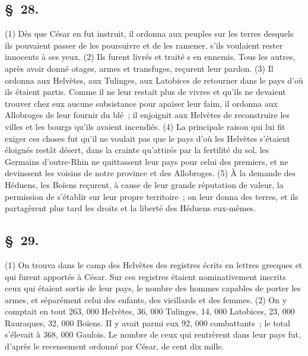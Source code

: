 \documentclass[french,twoside]{book} %
\begin{document}
\subsection[{§ 28.}]{ \textsc{§ 28.} }
\noindent (1) Dès que César en fut instruit, il ordonna aux peuples sur les terres desquels ils pouvaient passer de les poursuivre et de les ramener, s’ils voulaient rester innocents à ses yeux. (2) Ils furent livrés et traité s en ennemis. Tous les autres, après avoir donné otages, armes et transfuges, reçurent leur pardon. (3) Il ordonna aux Helvètes, aux Tulinges, aux Latobices de retourner dans le pays d’où ils étaient partis. Comme il ne leur restait plus de vivres et qu’ils ne devaient trouver chez eux aucune subsistance pour apaiser leur faim, il ordonna aux Allobroges de leur fournir du blé ; il enjoignit aux Helvètes de reconstruire les villes et les bourgs qu’ils avaient incendiés. (4) La principale raison qui lui fit exiger ces choses fut qu’il ne voulait pas que le pays d’où les Helvètes s’étaient éloignés restât désert, dans la crainte qu’attirés par la fertilité du sol, les Germains d’outre-Rhin ne quittassent leur pays pour celui des premiers, et ne devinssent les voisins de notre province et des Allobroges. (5) À la demande des Héduens, les Boïens reçurent, à cause de leur grande réputation de valeur, la permission de s’établir sur leur propre territoire ; on leur donna des terres, et ils partagèrent plus tard les droits et la liberté des Héduens eux-mêmes.
\subsection[{§ 29.}]{ \textsc{§ 29.} }
\noindent (1) On trouva dans le camp des Helvètes des registres écrits en lettres grecques et qui furent apportés à César. Sur ces registres étaient nominativement inscrits ceux qui étaient sortis de leur pays, le nombre des hommes capables de porter les armes, et séparément celui des enfants, des vieillards et des femmes. (2) On y comptait en tout 263, 000 Helvètes, 36, 000 Tulinges, 14, 000 Latobices, 23, 000 Rauraques, 32, 000 Boïens. II y avait parmi eux 92, 000 combattants ; le total s’élevait à 368, 000 Gaulois. Le nombre de ceux qui rentrèrent dans leur pays fut, d’après le recensement ordonné par César, de cent dix mille.
\end{document}
